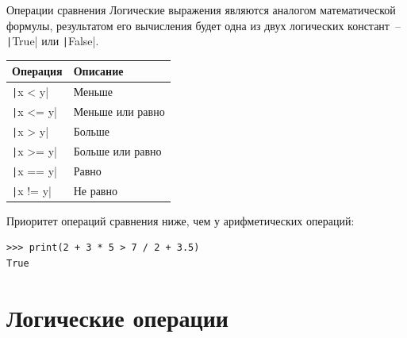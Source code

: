 \documentclass[aspectratio=169]{beamer}	%
\begin{document}
\begin{frame}[fragile]{Операции сравнения}
\scriptsize
Логические выражения являются аналогом математической формулы, результатом его вычисления будет одна из двух логических констант~-- \texttt|True| или \texttt|False|.

\begin{table}[h!]
\centering
\begin{tabular}{|p{}|p{}|}
	\hline
	\textbf{Операция} & \textbf{Описание} \\
	\hline
	\texttt|x < y| & Меньше \\
	\texttt|x <= y| & Меньше или равно \\
	\texttt|x > y| & Больше \\
	\texttt|x >= y| & Больше или равно \\
	\texttt|x == y| & Равно \\
	\texttt|x != y| & Не равно \\
	\hline
\end{tabular}	
\end{table}

{\color{tpugreen}\textbullet} Приоритет операций сравнения ниже, чем у арифметических операций:

\begin{verbatim}
>>> print(2 + 3 * 5 > 7 / 2 + 3.5)
True
\end{verbatim}
\vfill
\end{frame}


%
%
%
%


\section{Логические операции}
\sectionframe
\end{document}
